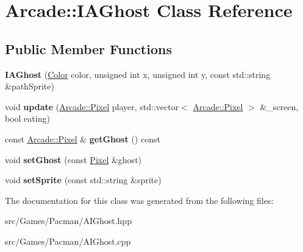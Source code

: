 \hypertarget{class_arcade_1_1_i_a_ghost}{}\section{Arcade\+:\+:I\+A\+Ghost Class Reference}
\label{class_arcade_1_1_i_a_ghost}
\subsection*{Public Member Functions}
\begin{DoxyCompactItemize}
\item 
\mbox{\label{class_arcade_1_1_i_a_ghost_aec64c7bcbaccae0978f3f1c749980540}} 
{\bfseries I\+A\+Ghost} (\mbox{\hyperlink{struct_arcade_1_1_color}{Color}} color, unsigned int x, unsigned int y, const std\+::string \&path\+Sprite)
\item 
\mbox{\label{class_arcade_1_1_i_a_ghost_abc1bab00a21e4aa368a7124a49005e96}} 
void {\bfseries update} (\mbox{\hyperlink{struct_arcade_1_1_pixel}{Arcade\+::\+Pixel}} player, std\+::vector$<$ \mbox{\hyperlink{struct_arcade_1_1_pixel}{Arcade\+::\+Pixel}} $>$ \&\+\_\+screen, bool eating)
\item 
\mbox{\label{class_arcade_1_1_i_a_ghost_a157b76d685a6a3b4627c4ad833ee8a0e}} 
const \mbox{\hyperlink{struct_arcade_1_1_pixel}{Arcade\+::\+Pixel}} \& {\bfseries get\+Ghost} () const
\item 
\mbox{\label{class_arcade_1_1_i_a_ghost_a9602c7b1f04d40bd5989ae4026aba5f6}} 
void {\bfseries set\+Ghost} (const \mbox{\hyperlink{struct_arcade_1_1_pixel}{Pixel}} \&ghost)
\item 
\mbox{\label{class_arcade_1_1_i_a_ghost_ae260a12b6cffefdb188daa1008e0a294}} 
void {\bfseries set\+Sprite} (const std\+::string \&sprite)
\end{DoxyCompactItemize}


The documentation for this class was generated from the following files\+:\begin{DoxyCompactItemize}
\item 
src/\+Games/\+Pacman/A\+I\+Ghost.\+hpp\item 
src/\+Games/\+Pacman/A\+I\+Ghost.\+cpp\end{DoxyCompactItemize}
